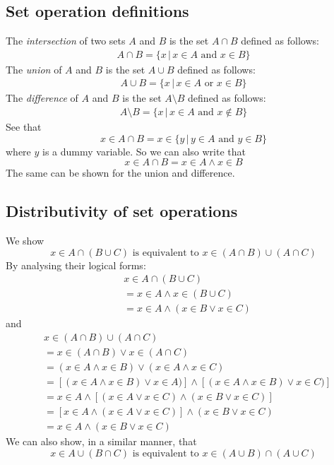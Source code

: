 \documentclass{report}
\begin{document}
\subsection{Set operation definitions}
The \textit{intersection} of two sets $A$ and $B$ is the set $A\cap B$ defined as follows:
\begin{align*}
A\cap B=\{x\,|\,x\in A\text{ and }x\in B\}
\end{align*}
The \textit{union} of $A$ and $B$ is the set $A\cup B$ defined as follows:
\begin{align*}
A\cup B=\{x\,|\,x\in A\text{ or }x\in B\}
\end{align*}
The \textit{difference} of $A$ and $B$ is the set $A\setminus B$ defined as follows:
\begin{align*}
A\setminus B=\{x\,|\,x\in A\text{ and }x\notin B\}
\end{align*}
See that 
\begin{equation*}
x\in A\cap B=x\in\{y\,|\,y\in A\text{ and }y\in B\}
\end{equation*}
where $y$ is a dummy variable. So we can also write that
\begin{equation*}
x\in A\cap B=x\in A\land x\in B
\end{equation*}
The same can be shown for the union and difference.

\subsection{Distributivity of set operations}
We show \begin{equation*} x\in A\cap(B\cup C)\text{ is equivalent to }
x\in(A\cap B)\cup(A\cap C)
\end{equation*}
By analysing their logical forms:
\begin{align*}
&x\in A\cap(B\cup C)\\
&=x\in A\land x\in(B\cup C)\\
&=x\in A\land(x\in B\lor x\in C)
\end{align*}
and
\begin{align*}
&x\in(A\cap B)\cup(A\cap C)\\
&=x\in(A\cap B)\lor x\in(A\cap C)\\
&=(x\in A\land x\in B)\lor(x\in A\land x\in C)\\
&=[(x\in A\land x\in B)\lor x\in A)]\land[(x\in A\land x\in B)\lor x\in C)]\\
&=x\in A\land[(x\in A\lor x\in C)\land(x\in B\lor x\in C)]\\
&=[x\in A\land(x\in A\lor x\in C)]\land(x\in B\lor x\in C)\\
&=x\in A\land(x\in B\lor x\in C)
\end{align*}
We can also show, in a similar manner, that
\begin{equation*}
x\in A\cup(B\cap C)\text{ is equivalent to }
x\in(A\cup B)\cap(A\cup C)
\end{equation*}
\newpage
\end{document}
